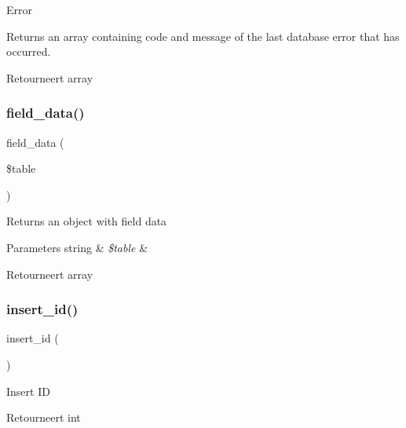 Error

Returns an array containing code and message of the last database error that has occurred.

\begin{DoxyReturn}{Retourneert}
array 
\end{DoxyReturn}
\mbox{\label{class_c_i___d_b__sqlite3__driver_a90355121e1ed009e0efdbd544ab56efa}} 
\subsubsection{\texorpdfstring{field\_data()}{field\_data()}}
{\footnotesize\ttfamily field\+\_\+data (\begin{DoxyParamCaption}\item[{}]{\$table }\end{DoxyParamCaption})}

Returns an object with field data


\begin{DoxyParams}[1]{Parameters}
string & {\em \$table} & \\
\hline
\end{DoxyParams}
\begin{DoxyReturn}{Retourneert}
array 
\end{DoxyReturn}
\mbox{\label{class_c_i___d_b__sqlite3__driver_a933f2cde8dc7f87875e257d0a4902e99}} 
\subsubsection{\texorpdfstring{insert\_id()}{insert\_id()}}
{\footnotesize\ttfamily insert\+\_\+id (\begin{DoxyParamCaption}{ }\end{DoxyParamCaption})}

Insert ID

\begin{DoxyReturn}{Retourneert}
int 
\end{DoxyReturn}
\mbox{\label{class_c_i___d_b__sqlite3__driver_aef08cd376b16b24608100ca0e3f2f85b}} 
